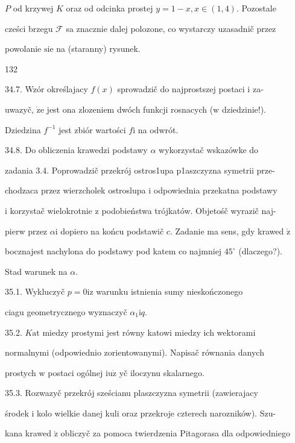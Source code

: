 \documentclass[a4paper,12pt]{article}
\begin{document}
$P$ od krzywej $K$ oraz od odcinka prostej $y=1-x,  x\in (1,4)$. Pozostale

cześci brzegu $\mathcal{F}$ sa znacznie dalej polozone, co wystarczy uzasadnič przez

powolanie $\mathrm{s}\mathrm{i}\mathrm{e}$ na (staranny) rysunek.





132

34.7. Wzór określajacy $f(x)$ sprowadzič do najprostszej postaci $\mathrm{i}$ za-

uwazyč, $\dot{\mathrm{z}}\mathrm{e}$ jest ona zlozeniem dwóch funkcji rosnacych ($\mathrm{w}$ dziedzinie!).

Dziedzina $f^{-1}$ jest zbiór wartości $f\mathrm{i}$ na odwrót.

34.8. Do obliczenia krawedzi podstawy $\alpha$ wykorzystač wskazówke do

zadania 3.4. Poprowadzič przekrój ostros1upa p1aszczyzna symetrii prze-

chodzaca przez wierzcholek ostroslupa $\mathrm{i}$ odpowiednia przekatna podstawy

$\mathrm{i}$ korzystač wielokrotnie $\mathrm{z}$ podobieństwa trójkatów. Objetośč wyrazič naj-

pierw przez $\alpha \mathrm{i}$ dopiero na końcu podstawič $c$. Zadanie ma sens, gdy krawed $\acute{\mathrm{z}}$

bocznajest nachylona do podstawy pod katem co najmniej $45^{\circ}$ (dlaczego?).

Stad warunek na $\alpha.$

35.1. Wykluczyč $p = 0 \mathrm{i} \mathrm{z}$ warunku istnienia sumy nieskończonego

ciagu geometrycznego wyznaczyč $\alpha_{1}\mathrm{i}q.$

35.2. $K\mathrm{a}\mathrm{t}$ miedzy prostymi jest równy katowi miedzy ich wektorami

normalnymi (odpowiednio zorientowanymi). Napisač równania danych

prostych $\mathrm{w}$ postaci ogólnej $\mathrm{i}\mathrm{u}\dot{\mathrm{z}}$ yč iloczynu skalarnego.

35.3. Rozwazyč przekrój sześcianu plaszczyzna symetrii (zawierajacy

środek $\mathrm{i}$ kolo wielkie danej kuli oraz przekroje czterech narozników). Szu-

kana krawed $\acute{\mathrm{z}}$ obliczyč za pomoca twierdzenia Pitagorasa dla odpowiedniego
\end{document}
